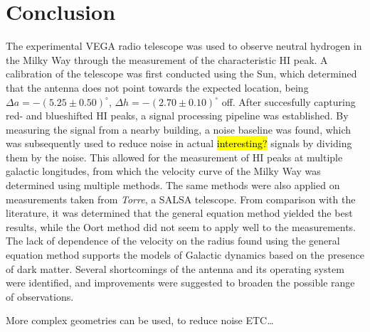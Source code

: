 \section{Conclusion}

The experimental VEGA radio telescope was used to observe neutral hydrogen in the Milky Way through the measurement of the characteristic HI peak. A calibration of the telescope was first conducted using the Sun, which determined that the antenna does not point towards the expected location, being $\Delta a = -(5.25 \pm 0.50)^\circ$, $\Delta h = -(2.70 \pm 0.10)^\circ$ off. After succesfully capturing red- and blueshifted HI peaks, a signal processing pipeline was established. By measuring the signal from a nearby building, a noise baseline was found, which was subsequently used to reduce noise in actual \hl{interesting?} signals by dividing them by the noise. This allowed for the measurement of HI peaks at multiple galactic longitudes, from which the velocity curve of the Milky Way was determined using multiple methods. The same methods were also applied on measurements taken from \emph{Torre}, a SALSA telescope. From comparison with the literature, it was determined that the general equation method yielded the best results, while the Oort method did not seem to apply well to the measurements. The lack of dependence of the velocity on the radius found using the general equation method supports the models of Galactic dynamics based on the presence of dark matter.   
Several shortcomings of the antenna and its operating system were identified, and improvements were suggested to broaden the possible range of observations.

More complex geometries can be used, to reduce noise ETC\ldots \cite{burke_introduction_2013}
